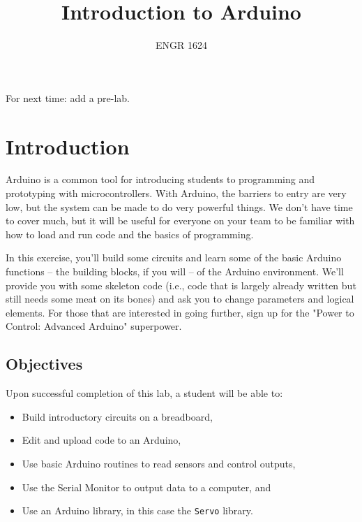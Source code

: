 \documentclass[11pt]{article} %
\title{Introduction to Arduino}
\author{ENGR 1624}
\date{} %
\begin{document}
\maketitle


For next time: add a pre-lab.

\section*{Introduction}

Arduino is a common tool for introducing students to programming and prototyping with microcontrollers. With Arduino, the barriers to entry are very low, but the system can be made to do very powerful things. We don’t have time to cover much, but it will be useful for everyone on your team to be familiar with how to load and run code and the basics of programming.

In this exercise, you’ll build some circuits and learn some of the basic Arduino functions -- the building blocks, if you will -- of the Arduino environment. We’ll provide you with some skeleton code (i.e., code that is largely already written but still needs some meat on its bones) and ask you to change parameters and logical elements. For those that are interested in going further, sign up for the "Power to Control: Advanced Arduino" superpower.%

\subsection*{Objectives}

Upon successful completion of this lab, a student will be able to:
\begin{itemize}
\item Build introductory circuits on a breadboard,
\item Edit and upload code to an Arduino,
\item Use basic Arduino routines to read sensors and control outputs,
\item Use the Serial Monitor to output data to a computer, and
\item Use an Arduino library, in this case the \verb|Servo| library.
\end{itemize}
\end{document}
